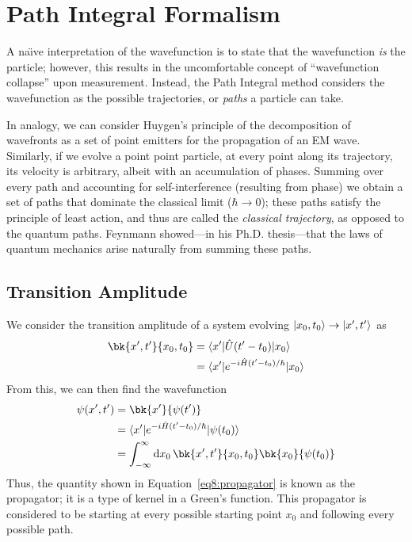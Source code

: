 \chapter{Path Integral Formalism}
A na\"\i ve interpretation of the wavefunction is to state that the wavefunction \emph{is} the particle; however, this results in the uncomfortable concept of ``wavefunction collapse'' upon measurement. Instead, the Path Integral method considers the wavefunction as the possible trajectories, or \emph{paths} a particle can take.

In analogy, we can consider Huygen's principle of the decomposition of wavefronts as a set of point emitters for the propagation of an EM wave. Similarly, if we evolve a point point particle, at every point along its trajectory, its velocity is arbitrary, albeit with an accumulation of phases. Summing over every path and accounting for self-interference (resulting from phase) we obtain a set of paths that dominate the classical limit (\(\hbar\to 0\)); these paths satisfy the principle of least action, and thus are called the \emph{classical trajectory}, as opposed to the quantum paths. Feynmann showed---in his Ph.D. thesis---that the laws of quantum mechanics arise naturally from summing these paths.

\section{Transition Amplitude}
We consider the transition amplitude of a system evolving \(\lvert x_0,t_0\rangle\rightarrow\lvert x',t'\rangle\) as
\begin{align}
	\bk{x',t'}{x_0,t_0}&=\b{x'}\hat U(t'-t_0)\k{x_0}\nonumber\\
			   &=\b{x'}e^{-i\hat H(t'-t_0)/\hbar}\k{x_0}\label{eq8:propagator}
\end{align}
From this, we can then find the wavefunction
\begin{align*}
	\p(x',t') &= \bk{x'}{\p(t')}\\
		  &=\b{x'}e^{-i\hat H(t'-t_0)/\hbar}\k{\p(t_0)}\\
		  &=\int_{-\infty}^\infty\d{x_0}\bk{x',t'}{x_0,t_0}\bk{x_0}{\p(t_0)}
\end{align*}
Thus, the quantity shown in Equation~\ref{eq8:propagator} is known as the propagator; it is a type of kernel in a Green's function. This propagator is considered to be starting at every possible starting point \(x_0\) and following every possible path.

